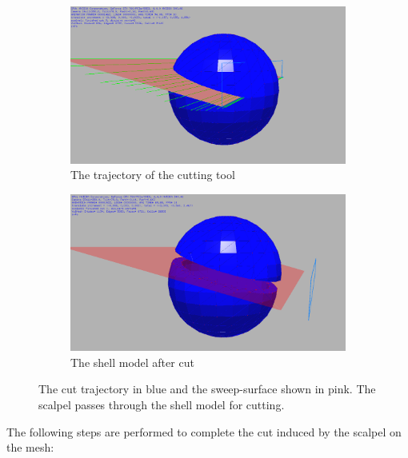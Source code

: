 \begin{figure}[H]
\centering
\begin{subfigure}{.5\textwidth}
  \centering
  \includegraphics[width=0.8\linewidth]{figures/cutting/trajectory03.png}
  \caption{The trajectory of the cutting tool}
  \label{fig:sub1}
\end{subfigure}%
\begin{subfigure}{.5\textwidth}
  \centering
  \includegraphics[width=0.8\linewidth]{figures/cutting/trajectory04.png}
  \caption{The shell model after cut}
  \label{fig:sub2}
\end{subfigure}
\caption{The cut trajectory in blue and the sweep-surface shown in pink. The scalpel passes through the shell model for cutting.}
\label{fig:sweepsurf}
\end{figure}


The following steps are performed to complete the cut induced by the scalpel on the mesh:


